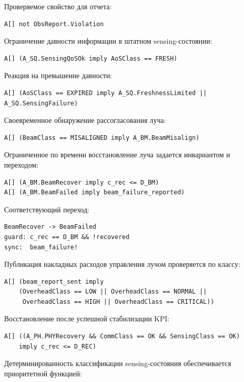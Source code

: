 \documentclass[12pt,a4paper]{article}
\begin{document}
Проверяемое свойство для отчета:

\begin{verbatim}
A[] not ObsReport.Violation
\end{verbatim}

Ограничение давности информации в штатном sensing-состоянии:

\begin{verbatim}
A[] (A_SQ.SensingQoSOk imply AoSClass == FRESH)
\end{verbatim}

Реакция на превышение давности:

\begin{verbatim}
A[] (AoSClass == EXPIRED imply A_SQ.FreshnessLimited || A_SQ.SensingFailure)
\end{verbatim}

Своевременное обнаружение рассогласования луча:

\begin{verbatim}
A[] (BeamClass == MISALIGNED imply A_BM.BeamMisalign)
\end{verbatim}

Ограниченное по времени восстановление луча задается инвариантом и переходом:

\begin{verbatim}
A[] (A_BM.BeamRecover imply c_rec <= D_BM)
A[] (A_BM.BeamFailed imply beam_failure_reported)
\end{verbatim}

Соответствующий переход:

\begin{verbatim}
BeamRecover -> BeamFailed
guard: c_rec == D_BM && !recovered
sync:  beam_failure!
\end{verbatim}

Публикация накладных расходов управления лучом проверяется по классу:

\begin{verbatim}
A[] (beam_report_sent imply
    (OverheadClass == LOW || OverheadClass == NORMAL ||
     OverheadClass == HIGH || OverheadClass == CRITICAL))
\end{verbatim}

Восстановление после успешной стабилизации KPI:

\begin{verbatim}
A[] ((A_PH.PHYRecovery && CommClass == OK && SensingClass == OK)
    imply c_rec <= D_REC)
\end{verbatim}

Детерминированность классификации sensing-состояния обеспечивается приоритетной функцией:
\end{document}
